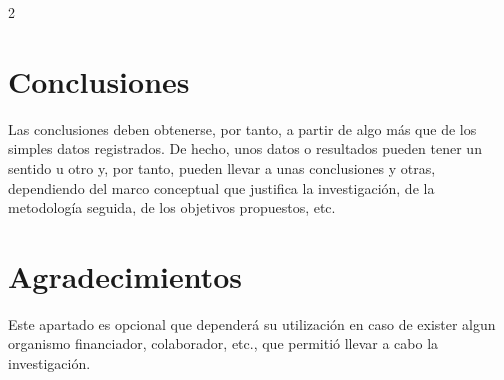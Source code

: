 \documentclass[12pt,twoside,titlepage]{ingenius}
\begin{document}
\begin{multicols}{2}
\section{Conclusiones}

Las conclusiones deben obtenerse, por tanto, a partir de algo más que de los simples datos registrados. De hecho, unos datos o resultados pueden tener un sentido u otro y, por tanto, pueden llevar a unas conclusiones y otras, dependiendo del marco conceptual que justifica la investigación, de la metodología seguida, de los objetivos propuestos, etc.

\section*{Agradecimientos}
Este apartado es opcional que dependerá su utilización en caso de exister algun organismo financiador, colaborador, etc., que permitió llevar a cabo la investigación.




\end{multicols}
\end{document}
